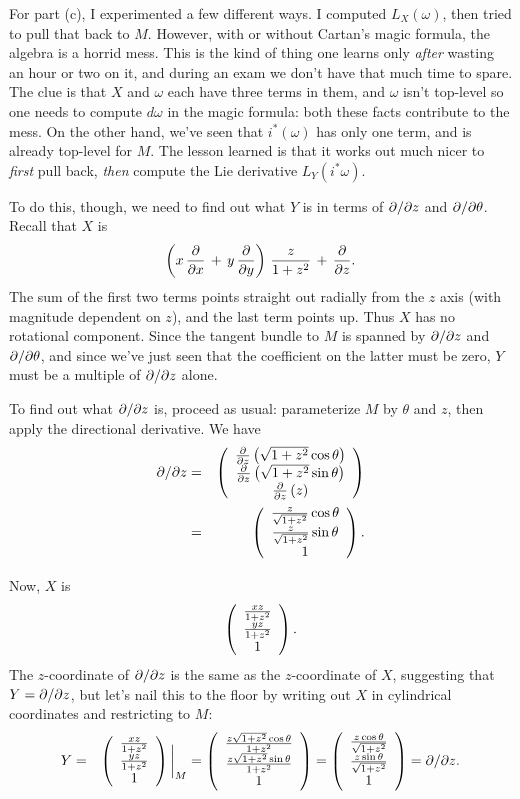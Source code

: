 \documentclass[10pt]{article}
\numberwithin{equation}{subsection}
\begin{document}
For part (c), I experimented a few different ways.  I computed $L_X(\omega)$,
then tried to pull that back to $M$.  However, with or without Cartan's magic
formula, the algebra is a horrid mess.  This is the kind of thing one learns
only \emph{after} wasting an hour or two on it, and during an exam we don't
have that much time to spare.  The clue is that $X$ and $\omega$ each have
three terms in them, and $\omega$ isn't top-level so one needs to compute
$d\omega$ in the magic formula:  both these facts contribute to the mess.  On
the other hand, we've seen that $i^*(\omega)$ has only one term, and is already
top-level for $M$.  The lesson learned is that it works out much nicer to
\emph{first} pull back, \emph{then} compute the Lie derivative
$L_Y(i^*\omega)$.

To do this, though, we need to find out what $Y$ is in terms of $\partial/\partial z$ and
$\partial/\partial \theta$.  Recall that $X$ is
$$
	\left(x\,\frac{\partial}{\partial x} \,+\, y\,\frac{\partial}{\partial y}\right)\, \frac{z}{1+z^2} \,+\, \frac{\partial}{\partial z}.
$$
The sum of the first two terms points straight out radially from the $z$ axis
(with magnitude dependent on $z$), and the last term points up.  Thus $X$ has
no rotational component.  Since the tangent bundle to $M$ is spanned by
$\partial/\partial z$ and $\partial/\partial \theta$, and since we've just seen that the coefficient
on the latter must be zero, $Y$ must be a multiple of $\partial/\partial z$ alone.

To find out what $\partial/\partial z$ is, proceed as usual:  parameterize $M$ by
$\theta$ and $z$, then apply the directional derivative.  We have
\begin{eqnarray*}
	\partial/\partial z &=& \left(\begin{array}{c} \frac{\partial}{\partial z}\left(\sqrt{1+z^2}\cos\theta\right) \\ \frac{\partial}{\partial z}\left(\sqrt{1+z^2}\sin\theta\right) \\ \frac{\partial}{\partial z}\left(z\right)\end{array}\right) \\
	&=& \left(\begin{array}{c} \frac{z}{\sqrt{1+z^2}}\cos\theta \\ \frac{z}{\sqrt{1+z^2}}\sin\theta \\ 1\end{array}\right).
\end{eqnarray*}

Now, $X$ is
$$
	\left(\begin{array}{c} \frac{xz}{1+z^2} \\ \frac{yz}{1+z^2} \\ 1\end{array}\right).
$$
The $z$-coordinate of $\partial/\partial z$ is the same as the $z$-coordinate of $X$,
suggesting that $Y=\partial/\partial z$, but let's nail this to the floor by writing out
$X$ in cylindrical coordinates and restricting to $M$:
\begin{eqnarray*}
	Y &=& \left(\begin{array}{c} \frac{xz}{1+z^2} \\ \frac{yz}{1+z^2} \\ 1\end{array}\right)\bigg|_{\tiny{M}}
	= \left(\begin{array}{c} \frac{z\sqrt{1+z^2}\cos\theta}{1+z^2} \\ \frac{z\sqrt{1+z^2}\sin\theta}{1+z^2} \\ 1\end{array}\right)
	= \left(\begin{array}{c} \frac{z\cos\theta}{\sqrt{1+z^2}} \\ \frac{z\sin\theta}{\sqrt{1+z^2}} \\ 1\end{array}\right)
	= \partial/\partial z.
\end{eqnarray*}
\end{document}
